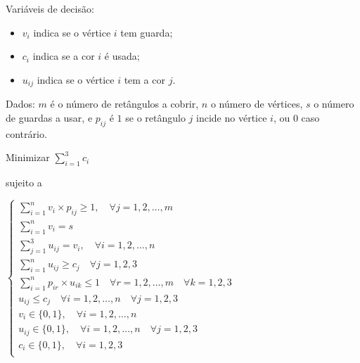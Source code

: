 \documentclass{article}
\begin{document}
Variáveis de decisão:
\begin{itemize}[leftmargin=1.5cm]
	\item $v_{i}$ indica se o vértice $i$ tem guarda;
	\item $c_{i}$ indica se a cor $i$ é usada;
	\item $u_{ij}$ indica se o vértice $i$ tem a cor $j$.
\end{itemize}

Dados: $m$ é o número de retângulos a cobrir, $n$ o número de vértices, $s$ o número de guardas a usar, e $p_{ij}$ é $1$ se o retângulo $j$ incide no vértice $i$, ou $0$ caso contrário.

Minimizar
$\displaystyle \sum_{i = 1}^{3} c_{i}$

sujeito a

\(
\begin{cases}
	\sum_{i = 1}^{n} v_{i} \times p_{ij} \ge 1, \quad \forall j = 1,2,\dots,m                         \\
	\sum_{i = 1}^{n} v_{i} = s                                                                        \\
	\sum_{j = 1}^{3} u_{ij} = v_{i}, \quad \forall i = 1,2,\dots,n                                    \\
	\sum_{i = 1}^{n} u_{ij} \ge c_{j} \quad \forall j = 1,2,3                                         \\
	\sum_{i = 1}^{n} p_{ir} \times u_{ik} \le 1 \quad \forall r = 1,2,\dots,m \quad \forall k = 1,2,3 \\
	u_{ij} \le c_{j} \quad \forall i = 1,2,\dots,n \quad \forall j = 1,2,3                            \\
	v_{i} \in \{0,1\}, \quad \forall i = 1,2,\dots,n                                                  \\
	u_{ij} \in \{0,1\}, \quad \forall i = 1,2,\dots,n \quad \forall j = 1,2,3                         \\
	c_{i} \in \{0,1\}, \quad \forall i = 1,2,3                                                        \\
\end{cases}
\)
\end{document}
